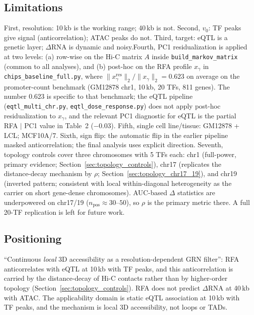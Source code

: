\documentclass[11pt,a4paper]{article}
\begin{document}
\subsection{Limitations}
First, resolution: 10\,kb is the working range; 40\,kb is not. Second, $v_0$: TF peaks give signal (anticorrelation); ATAC peaks do not. Third, target: eQTL is a genetic layer; $\Delta$RNA is dynamic and noisy.Fourth, PC1 residualization is applied at two levels: (a) row-wise on the Hi-C matrix $A$ inside \texttt{build\_markov\_matrix} (common to all analyses), and (b) post-hoc on the RFA profile $x_\gamma$ in \texttt{chips\_baseline\_full.py}, where $\|x^{\mathrm{res}}_\gamma\|_2/\|x_\gamma\|_2 = 0.623$ on average on the promoter-count benchmark (GM12878 chr1, 10\,kb, 20 TFs, 811 genes). The number 0.623 is specific to that benchmark; the eQTL pipeline (\texttt{eqtl\_multi\_chr.py}, \texttt{eqtl\_dose\_response.py}) does not apply post-hoc residualization to $x_\gamma$, and the relevant PC1 diagnostic for eQTL is the partial RFA $\mid$ PC1 value in Table~2 ($-0.03$). Fifth, single cell line/tissue: GM12878 + LCL; MCF10A/7. Sixth, sign flip: the automatic flip in the earlier pipeline masked anticorrelation; the final analysis uses explicit direction. Seventh, topology controls cover three chromosomes with 5 TFs each:
chr1 (full-power, primary evidence; Section~\ref{sec:topology_controls}),
chr17 (replicates the distance-decay mechanism by $\rho$;
Section~\ref{sec:topology_chr17_19}), and chr19 (inverted pattern;
consistent with local within-diagonal heterogeneity as the carrier on
short gene-dense chromosomes). AUC-based $\Delta$ statistics are
underpowered on chr17/19 ($n_{\mathrm{pos}}\approx 30$--$50$), so $\rho$
is the primary metric there. A full 20-TF replication is left for future
work.

\subsection{Positioning}
``Continuous \emph{local} 3D accessibility as a resolution-dependent GRN filter'': RFA anticorrelates with eQTL at 10\,kb with TF peaks, and this anticorrelation is carried by the distance-decay of Hi-C contacts rather than by higher-order topology (Section~\ref{sec:topology_controls}). RFA does not predict $\Delta$RNA at 40\,kb with ATAC. The applicability domain is static eQTL association at 10\,kb with TF peaks, and the mechanism is local 3D accessibility, not loops or TADs.
\end{document}
